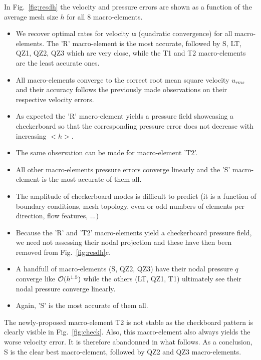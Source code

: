 \documentclass[a4paper,12pt]{article}
\begin{document}
In Fig.~\ref{fig:resdh} the velocity and pressure errors are shown as a function of the 
average mesh size $h$ for all 8 macro-elements.

\begin{itemize}

\item We recover optimal rates for velocity ${\bm u}$ (quadratic convergence) for all macro-elements.
The 'R' macro-element is the most accurate, followed by S, LT, QZ1, QZ2, QZ3 which are very close, 
while the T1 and T2 macro-elements are the least accurate ones. 
\item All macro-elements converge to the correct root mean square velocity $u_{rms}$ and 
their accuracy follows the previously made observations on their respective velocity errors.

\item As expected the 'R' macro-element yields a pressure field showcasing a checkerboard so that 
the corresponding pressure error does not decrease with increasing $<h>$. 
\item The same observation can be made for macro-element 'T2'. 
\item All other macro-elements pressure errors converge linearly and the 'S' macro-element is
the most accurate of them all.
\item The amplitude of checkerboard modes is difficult to predict (it is a function 
of boundary conditions, mesh topology, even or odd numbers of elements per direction, flow features, ...) 

\item Because the 'R' and 'T2' macro-elements yield a checkerboard pressure field, we need not
assessing their nodal projection and these have then been removed from Fig.~\ref{fig:resdh}c.
\item A handfull of macro-elements (S, QZ2, QZ3) have their nodal pressure $q$ converge like ${\cal O}(h^{1.5})$
while the others (LT, QZ1, T1) ultimately see their nodal pressure converge linearly.
\item Again, 'S' is the most accurate of them all.

\end{itemize}


The newly-proposed macro-element T2 is not stable as the checkboard pattern is clearly visible 
in Fig.~\ref{fig:check}. 
Also, this macro-element also always yields the worse velocity error. It is therefore abandonned in what follows. 
As a conclusion, S is the clear best macro-element, followed by QZ2 and QZ3 macro-elements.
\end{document}
